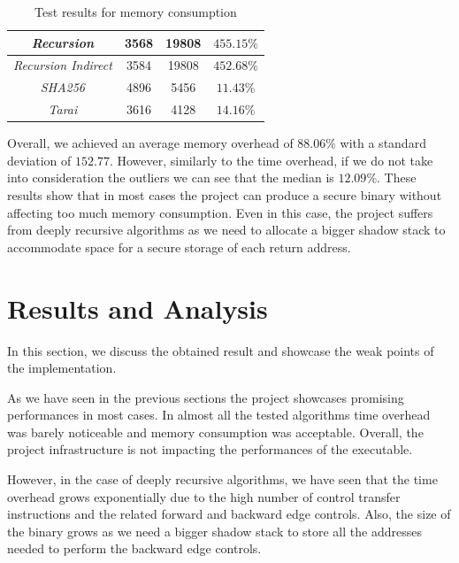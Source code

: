 \begin{table}
\begin{tabular}{|c|c|c|c|}
    \hline
    \textit{Recursion}                   & 3568                         & 19808                        & $455.15\%$               \\
    \hline
    \textit{Recursion Indirect}          & 3584                         & 19808                        & $452.68\%$               \\
    \hline
    \textit{SHA256}                      & 4896                         & 5456                         & $11.43\%$                \\
    \hline
    \textit{Tarai}                       & 3616                         & 4128                         & $14.16\%$                \\
    \hline
  \end{tabular}
  \caption{Test results for memory consumption}
  \label{tab:binsize}
\end{table}

Overall, we achieved an average memory overhead of $88.06\%$ with a standard
deviation of $152.77$. However, similarly to the time overhead, if we do not take
into consideration the outliers we can see that the median is $12.09 \%$. These
results show that in most cases the project can produce a secure binary without
affecting too much memory consumption. Even in this case, the project suffers
from deeply recursive algorithms as we need to allocate a bigger shadow stack to
accommodate space for a secure storage of each return address.

\section{Results and Analysis}
\label{sec:pa_results}

In this section, we discuss the obtained result and showcase the weak points of
the implementation.

As we have seen in the previous sections the project showcases promising
performances in most cases. In almost all the tested algorithms time overhead was
barely noticeable and memory consumption was acceptable. Overall, the project infrastructure
is not impacting the performances of the executable.

However, in the case of deeply recursive algorithms, we have seen that the time overhead
grows exponentially due to the high number of control transfer instructions and the
related forward and backward edge controls. Also, the size of the binary grows as
we need a bigger shadow stack to store all the addresses needed to perform the backward
edge controls.

